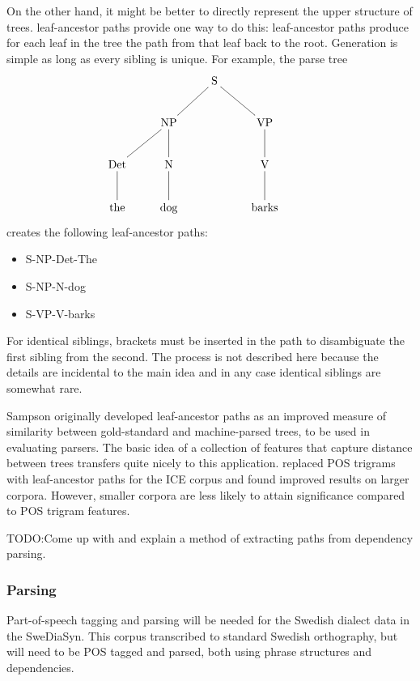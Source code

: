 \documentclass[11pt]{article}
\begin{document}
On the other hand, it might be better to directly represent the upper
structure of trees.  leaf-ancestor paths provide
one way to do this: leaf-ancestor paths produce for each leaf in the
tree the path from that leaf back to the root. Generation is
simple as long as every sibling is unique. For example, the parse tree
\[\xymatrix{
  &&\textrm{S} \ar@{-}[dl] \ar@{-}[dr] &&\\
  &\textrm{NP} \ar@{-}[d] \ar@{-}[dl] &&\textrm{VP} \ar@{-}[d]\\
  \textrm{Det} \ar@{-}[d] & \textrm{N} \ar@{-}[d] && \textrm{V} \ar@{-}[d] \\
\textrm{the}& \textrm{dog} && \textrm{barks}\\}
\]
creates the following leaf-ancestor paths:

\begin{itemize}
\item S-NP-Det-The
\item S-NP-N-dog
\item S-VP-V-barks
\end{itemize}

For identical siblings, brackets must be inserted in the path to
disambiguate the first sibling from the second. The process is not
described here because the details are incidental to the main idea and
in any case identical siblings are somewhat rare.

Sampson originally developed leaf-ancestor paths as an improved
measure of similarity between gold-standard and machine-parsed trees,
to be used in evaluating parsers. The basic idea of a collection of
features that capture distance between trees transfers quite nicely to
this application.  replaced POS trigrams with
leaf-ancestor paths for the ICE corpus and found improved results on
larger corpora. However, smaller corpora are less likely to attain
significance compared to POS trigram features.


TODO:Come up with and explain a method of extracting paths from
dependency parsing.

\subsubsection{Parsing}

Part-of-speech tagging and parsing will be needed for the Swedish dialect
data in the SweDiaSyn. This corpus transcribed to standard Swedish
orthography, but will need to be POS tagged and parsed, both using
phrase structures and dependencies.
\end{document}
